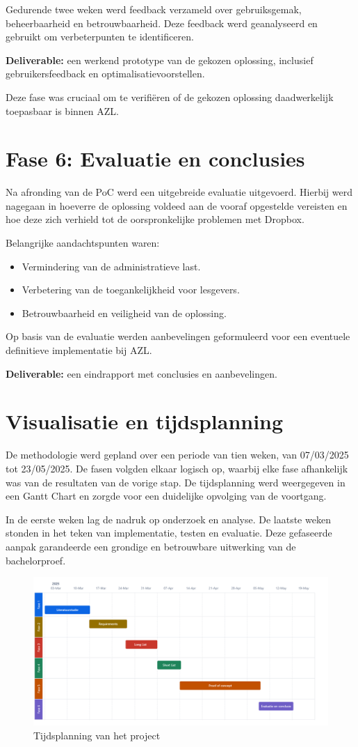 Gedurende twee weken werd feedback verzameld over gebruiksgemak, beheerbaarheid en betrouwbaarheid. 
Deze feedback werd geanalyseerd en gebruikt om verbeterpunten te identificeren.

\textbf{Deliverable:} een werkend prototype van de gekozen oplossing, inclusief gebruikersfeedback en optimalisatievoorstellen.

Deze fase was cruciaal om te verifiëren of de gekozen oplossing daadwerkelijk toepasbaar is binnen AZL.

\section{Fase 6: Evaluatie en conclusies}
Na afronding van de PoC werd een uitgebreide evaluatie uitgevoerd. Hierbij werd nagegaan in hoeverre de oplossing 
voldeed aan de vooraf opgestelde vereisten en hoe deze zich verhield tot de oorspronkelijke problemen met Dropbox.

Belangrijke aandachtspunten waren:
\begin{itemize}
    \item Vermindering van de administratieve last.
    \item Verbetering van de toegankelijkheid voor lesgevers.
    \item Betrouwbaarheid en veiligheid van de oplossing.
\end{itemize}

Op basis van de evaluatie werden aanbevelingen geformuleerd voor een eventuele definitieve implementatie bij AZL.

\textbf{Deliverable:} een eindrapport met conclusies en aanbevelingen.

\section{Visualisatie en tijdsplanning}
De methodologie werd gepland over een periode van tien weken, van 07/03/2025 tot 23/05/2025. 
De fasen volgden elkaar logisch op, waarbij elke fase afhankelijk was van de resultaten van de vorige stap. 
De tijdsplanning werd weergegeven in een Gantt Chart en zorgde voor een duidelijke opvolging van de voortgang.

In de eerste weken lag de nadruk op onderzoek en analyse. De laatste weken stonden in het teken van implementatie, testen en evaluatie. 
Deze gefaseerde aanpak garandeerde een grondige en betrouwbare uitwerking van de bachelorproef.

\begin{figure}[h!]
    \centering
    \includegraphics[width=.5\textwidth]{../graphics/Chart-Tijd-Visualisatie.png}
    \caption{Tijdsplanning van het project}
    \label{fig:tijdsplanning}
\end{figure}